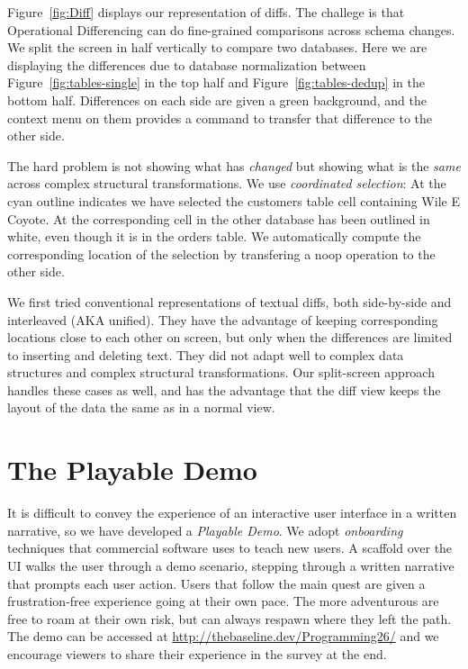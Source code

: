 \documentclass[english,submission]{programming}
\theoremstyle{definition}
\begin{document}
Figure~\ref{fig:Diff} displays our representation of diffs. The challege is that Operational Differencing can do fine-grained comparisons across schema changes. We split the screen in half vertically to compare two databases. Here we are displaying the differences due to database normalization between Figure~\ref{fig:tables-single} in the top half and Figure~\ref{fig:tables-dedup} in the bottom half. Differences on each side are given a green background, and the context menu on them provides a command to transfer that difference to the other side.

The hard problem is not showing what has \textit{changed} but showing what is the \textit{same} across complex structural transformations.
We use \textit{coordinated selection}:  At  the cyan outline indicates we have selected the \textsf{customers} table cell containing \textsf{Wile E Coyote}. At  the corresponding cell in the other database has been outlined in white, even though it is in the \textsf{orders} table. We automatically compute the corresponding location of the selection by transfering a \textsf{noop} operation to the other side.

We first tried conventional representations of textual diffs, both side-by-side and interleaved (AKA unified). They have the advantage of keeping corresponding locations close to each other on screen, but only when the differences are limited to inserting and deleting text. They did not adapt well to complex data structures and complex structural transformations. Our split-screen approach handles these cases as well, and has the advantage that the diff view keeps the layout of the data the same as in a normal view.



\section{The Playable Demo}\label{demo}

It is difficult to convey the experience of an interactive user interface in a written narrative, so we have developed a \textit{Playable Demo}. We adopt \textit{onboarding} techniques that commercial software uses to teach new users. A scaffold over the UI walks the user through a demo scenario, stepping through a written narrative that prompts each user action. Users that follow the main quest are given a frustration-free experience going at their own pace. The more adventurous are free to roam at their own risk, but can always respawn where they left the path. The demo can be accessed at \url{http://thebaseline.dev/Programming26/} and we encourage viewers to share their experience in the survey at the end.
\end{document}
